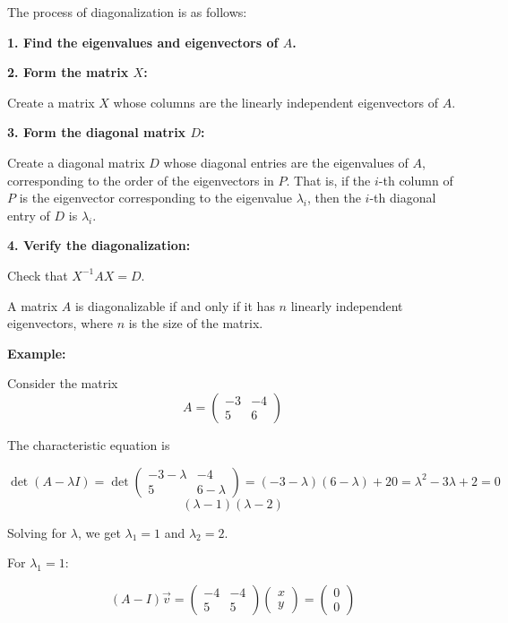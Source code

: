 The process of diagonalization is as follows:
\vspace{\baselineskip}

\textbf{1. Find the eigenvalues and eigenvectors of \(A\).}
\vspace{\baselineskip}

\textbf{2. Form the matrix \(X\):}

Create a matrix \(X\) whose columns are the linearly independent eigenvectors of \(A\).
\vspace{\baselineskip}

\textbf{3. Form the diagonal matrix \(D\):} 

Create a diagonal matrix \(D\) whose diagonal entries are the eigenvalues of \(A\), corresponding to the order of the eigenvectors in \(P\). That is, if the \(i\)-th column of \(P\) is the eigenvector corresponding to the eigenvalue \(\lambda_i\), then the \(i\)-th diagonal entry of \(D\) is \(\lambda_i\).
\vspace{\baselineskip}

\textbf{4. Verify the diagonalization:}
    
Check that \(X^{-1}AX = D\).
\vspace{\baselineskip}

A matrix \(A\) is diagonalizable if and only if it has \(n\) linearly independent eigenvectors, where \(n\) is the size of the matrix.
\vspace{\baselineskip}

\textbf{Example: }
\vspace{\baselineskip}

Consider the matrix
\[
A = \begin{pmatrix}
-3 & -4 \\
5 & 6
\end{pmatrix}
\]


The characteristic equation is

\[
\det(A - \lambda I) 
= \det 
\begin{pmatrix}
        -3 - \lambda & -4 \\
    5 & 6 - \lambda
\end{pmatrix} 
= (-3 - \lambda)(6 - \lambda) + 20 = \lambda^2 - 3\lambda + 2 = 0    
\]
\[
(\lambda - 1)(\lambda - 2)
\]

Solving for \(\lambda\), we get \(\lambda_1 = 1\) and \(\lambda_2 = 2\).
\vspace{\baselineskip}

For \(\lambda_1 = 1\):

\[
   (A - I)\vec{v} = \begin{pmatrix}
    -4 & -4 \\
    5 & 5
    \end{pmatrix} \begin{pmatrix}
    x \\
    y
    \end{pmatrix} = \begin{pmatrix}
    0 \\
    0
    \end{pmatrix}
\]

